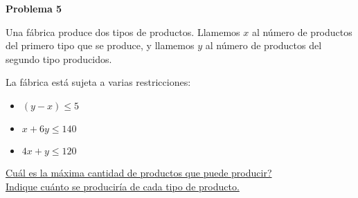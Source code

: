 \begin{center}
\Large \textbf{Problema 5}
\end{center}

\bigskip

Una fábrica produce dos tipos de productos. Llamemos $x$ al número de productos del primero tipo que se produce, y llamemos $y$ al número de productos del segundo tipo producidos.

\bigskip
La fábrica está sujeta a varias restricciones:
\begin{itemize}
    \item $(y - x) \le 5$
    \item $x + 6y \le 140$
    \item $4x + y \le 120$
\end{itemize}

\underline{Cuál es la máxima cantidad de productos que puede producir?} \\
\underline{Indique cuánto se produciría de cada tipo de producto.}

